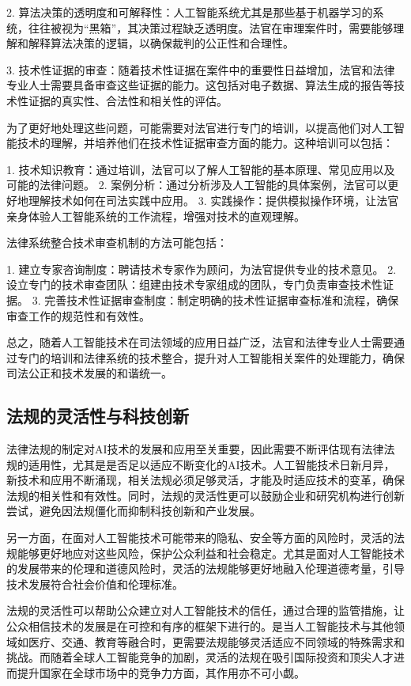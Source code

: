 2. 算法决策的透明度和可解释性：人工智能系统尤其是那些基于机器学习的系统，往往被视为“黑箱”，其决策过程缺乏透明度。法官在审理案件时，需要能够理解和解释算法决策的逻辑，以确保裁判的公正性和合理性。

3. 技术性证据的审查：随着技术性证据在案件中的重要性日益增加，法官和法律专业人士需要具备审查这些证据的能力。这包括对电子数据、算法生成的报告等技术性证据的真实性、合法性和相关性的评估。

为了更好地处理这些问题，可能需要对法官进行专门的培训，以提高他们对人工智能技术的理解，并培养他们在技术性证据审查方面的能力。这种培训可以包括：

1. 技术知识教育：通过培训，法官可以了解人工智能的基本原理、常见应用以及可能的法律问题。
2. 案例分析：通过分析涉及人工智能的具体案例，法官可以更好地理解技术如何在司法实践中应用。
3. 实践操作：提供模拟操作环境，让法官亲身体验人工智能系统的工作流程，增强对技术的直观理解。

法律系统整合技术审查机制的方法可能包括：

1. 建立专家咨询制度：聘请技术专家作为顾问，为法官提供专业的技术意见。
2. 设立专门的技术审查团队：组建由技术专家组成的团队，专门负责审查技术性证据。
3. 完善技术性证据审查制度：制定明确的技术性证据审查标准和流程，确保审查工作的规范性和有效性。

总之，随着人工智能技术在司法领域的应用日益广泛，法官和法律专业人士需要通过专门的培训和法律系统的技术整合，提升对人工智能相关案件的处理能力，确保司法公正和技术发展的和谐统一。

\subsection{法规的灵活性与科技创新}
法律法规的制定对AI技术的发展和应用至关重要，因此需要不断评估现有法律法规的适用性，尤其是是否足以适应不断变化的AI技术。人工智能技术日新月异，新技术和应用不断涌现，相关法规必须足够灵活，才能及时适应技术的变革，确保法规的相关性和有效性。同时，法规的灵活性更可以鼓励企业和研究机构进行创新尝试，避免因法规僵化而抑制科技创新和产业发展。

另一方面，在面对人工智能技术可能带来的隐私、安全等方面的风险时，灵活的法规能够更好地应对这些风险，保护公众利益和社会稳定。尤其是面对人工智能技术的发展带来的伦理和道德风险时，灵活的法规能够更好地融入伦理道德考量，引导技术发展符合社会价值和伦理标准。

法规的灵活性可以帮助公众建立对人工智能技术的信任，通过合理的监管措施，让公众相信技术的发展是在可控和有序的框架下进行的。是当人工智能技术与其他领域如医疗、交通、教育等融合时，更需要法规能够灵活适应不同领域的特殊需求和挑战。而随着全球人工智能竞争的加剧，灵活的法规在吸引国际投资和顶尖人才进而提升国家在全球市场中的竞争力方面，其作用亦不可小觑。

